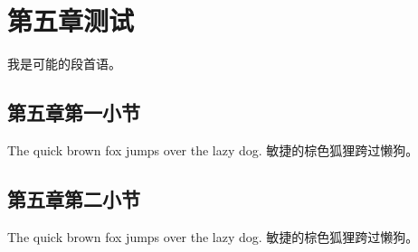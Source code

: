 \chapter{第五章测试}
\label{chap:quinary}

我是可能的段首语。

\section{第五章第一小节}
\label{sec:quinary:1}

The quick brown fox jumps over the lazy dog. 敏捷的棕色狐狸跨过懒狗。

\section{第五章第二小节}
\label{sec:quinary:2}

The quick brown fox jumps over the lazy dog. 敏捷的棕色狐狸跨过懒狗。

